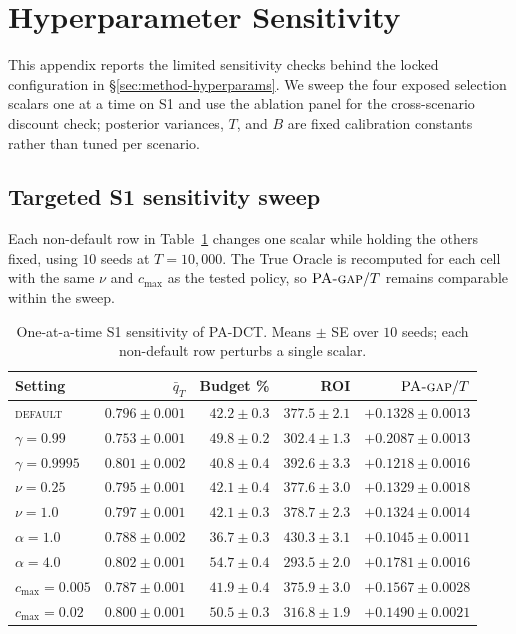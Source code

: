 \section{Hyperparameter Sensitivity}
\label{appendix:sensitivity}

This appendix reports the limited sensitivity checks behind the locked
configuration in \S\ref{sec:method-hyperparams}. We sweep the four exposed
selection scalars one at a time on S1 and use the ablation panel for the
cross-scenario discount check; posterior variances, $T$, and $B$ are fixed
calibration constants rather than tuned per scenario.

\subsection{Targeted S1 sensitivity sweep}
\label{app:s1-sensitivity}

Each non-default row in Table~\ref{tab:s1-sensitivity} changes one scalar while
holding the others fixed, using $10$ seeds at $T=10{,}000$. The True Oracle is
recomputed for each cell with the same $\nu$ and $c_{\max}$ as the tested
policy, so $\textsc{PA-gap}/T$ remains comparable within the sweep.

\begin{table}[H]
\centering
\footnotesize
\setlength{\tabcolsep}{2pt}
\renewcommand{\arraystretch}{0.98}
\caption{One-at-a-time S1 sensitivity of PA-DCT. Means $\pm$ SE over $10$
seeds; each non-default row perturbs a single scalar.}
\label{tab:s1-sensitivity}
\begin{tabular*}{\columnwidth}{@{\extracolsep{\fill}}lrrrr@{}}
\toprule
Setting & $\bar q_T$ & Budget \% & ROI & $\textsc{PA-gap}/T$ \\
\midrule
\textsc{default}       & $0.796{\pm}0.001$ & $42.2{\pm}0.3$ & $377.5{\pm}2.1$ & $+0.1328{\pm}0.0013$ \\
\midrule
$\gamma=0.99$      & $0.753{\pm}0.001$ & $49.8{\pm}0.2$ & $302.4{\pm}1.3$ & $+0.2087{\pm}0.0013$ \\
$\gamma=0.9995$    & $0.801{\pm}0.002$ & $40.8{\pm}0.4$ & $392.6{\pm}3.3$ & $+0.1218{\pm}0.0016$ \\
$\nu=0.25$         & $0.795{\pm}0.001$ & $42.1{\pm}0.4$ & $377.6{\pm}3.0$ & $+0.1329{\pm}0.0018$ \\
$\nu=1.0$          & $0.797{\pm}0.001$ & $42.1{\pm}0.3$ & $378.7{\pm}2.3$ & $+0.1324{\pm}0.0014$ \\
$\alpha=1.0$       & $0.788{\pm}0.002$ & $36.7{\pm}0.3$ & $430.3{\pm}3.1$ & $+0.1045{\pm}0.0011$ \\
$\alpha=4.0$       & $0.802{\pm}0.001$ & $54.7{\pm}0.4$ & $293.5{\pm}2.0$ & $+0.1781{\pm}0.0016$ \\
$c_{\max}=0.005$   & $0.787{\pm}0.001$ & $41.9{\pm}0.4$ & $375.9{\pm}3.0$ & $+0.1567{\pm}0.0028$ \\
$c_{\max}=0.02$    & $0.800{\pm}0.001$ & $50.5{\pm}0.3$ & $316.8{\pm}1.9$ & $+0.1490{\pm}0.0021$ \\
\bottomrule
\end{tabular*}
\end{table}

